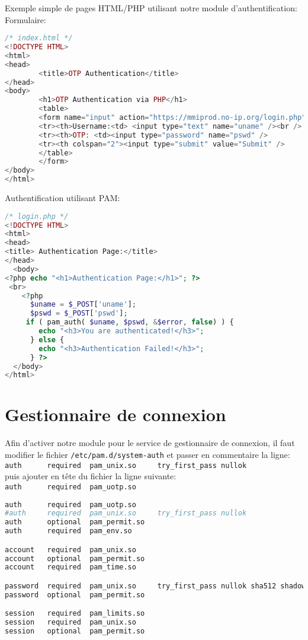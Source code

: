 \documentclass{"../../../res/univ-projet"}
\begin{document}
Exemple simple de pages HTML/PHP utilisant notre module d'authentification:
Formulaire:
\begin{lstlisting}[language=php]
/* index.html */
<!DOCTYPE HTML>
<html>
<head>
        <title>OTP Authentication</title>
</head>
<body>
        <h1>OTP Authentication via PHP</h1>
        <table>
        <form name="input" action="https://mmiprod.no-ip.org/login.php" method="post">
        <tr><th>Username:<td> <input type="text" name="uname" /><br />
        <tr><th>OTP: <td><input type="password" name="pswd" />
        <tr><th colspan="2"><input type="submit" value="Submit" />
        </table>
        </form>
</body>
</html> 
\end{lstlisting}

Authentification utilisant PAM:
\begin{lstlisting}[language=php]
/* login.php */
<!DOCTYPE HTML>
<html>
<head>
<title> Authentication Page:</title>
</head>
  <body>
<?php echo "<h1>Authentication Page:</h1>"; ?>
 <br>
    <?php
      $uname = $_POST['uname'];
      $pswd = $_POST['pswd'];
     if ( pam_auth( $uname, $pswd, &$error, false) ) {
        echo "<h3>You are authenticated!</h3>";
      } else {
        echo "<h3>Authentication Failed!</h3>";
      } ?>
  </body>
</html> 
\end{lstlisting}

\newpage

\section{Gestionnaire de connexion}
Afin d'activer notre module pour le service de gestionnaire de connexion, il faut modifier le fichier \verb?/etc/pam.d/system-auth?
et passer en commentaire la ligne:\\
\verb?auth      required  pam_unix.so     try_first_pass nullok?\\
puis ajouter en tête du fichier la ligne suivante:\\
\verb?auth      required  pam_uotp.so?
\begin{lstlisting}[language=bash, backgroundcolor=\color{black}, basicstyle=\color{white}]
auth      required  pam_uotp.so
#auth     required  pam_unix.so     try_first_pass nullok
auth      optional  pam_permit.so
auth      required  pam_env.so

account   required  pam_unix.so
account   optional  pam_permit.so
account   required  pam_time.so

password  required  pam_unix.so     try_first_pass nullok sha512 shadow
password  optional  pam_permit.so

session   required  pam_limits.so
session   required  pam_unix.so
session   optional  pam_permit.so
\end{lstlisting}
\end{document}
